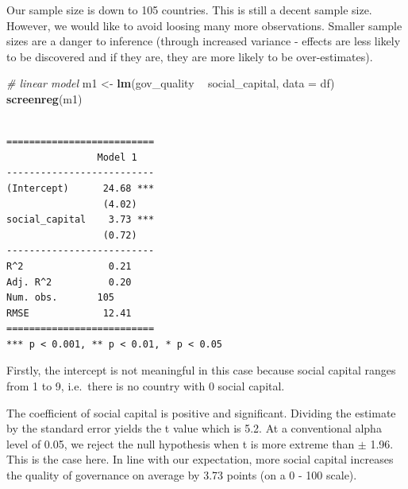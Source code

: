 \documentclass[]{article}
\newenvironment{Shaded}{\begin{snugshade}}{\end{snugshade}}
\newcommand{\KeywordTok}[1]{\textcolor[rgb]{0.13,0.29,0.53}{\textbf{#1}}}
\newcommand{\DataTypeTok}[1]{\textcolor[rgb]{0.13,0.29,0.53}{#1}}
\newcommand{\StringTok}[1]{\textcolor[rgb]{0.31,0.60,0.02}{#1}}
\newcommand{\CommentTok}[1]{\textcolor[rgb]{0.56,0.35,0.01}{\textit{#1}}}
\newcommand{\OperatorTok}[1]{\textcolor[rgb]{0.81,0.36,0.00}{\textbf{#1}}}
\newcommand{\NormalTok}[1]{#1}
\theoremstyle{definition}
\theoremstyle{definition}
\theoremstyle{definition}
\theoremstyle{remark}
\begin{document}
\begin{Shaded}
\end{Shaded}

Our sample size is down to 105 countries. This is still a decent sample
size. However, we would like to avoid loosing many more observations.
Smaller sample sizes are a danger to inference (through increased
variance - effects are less likely to be discovered and if they are,
they are more likely to be over-estimates).

\begin{Shaded}
\begin{Highlighting}[]
\CommentTok{# linear model}
\NormalTok{m1 <-}\StringTok{ }\KeywordTok{lm}\NormalTok{(gov_quality }\OperatorTok{~}\StringTok{ }\NormalTok{social_capital, }\DataTypeTok{data =}\NormalTok{ df)}
\KeywordTok{screenreg}\NormalTok{(m1)}
\end{Highlighting}
\end{Shaded}

\begin{verbatim}

==========================
                Model 1   
--------------------------
(Intercept)      24.68 ***
                 (4.02)   
social_capital    3.73 ***
                 (0.72)   
--------------------------
R^2               0.21    
Adj. R^2          0.20    
Num. obs.       105       
RMSE             12.41    
==========================
*** p < 0.001, ** p < 0.01, * p < 0.05
\end{verbatim}

Firstly, the intercept is not meaningful in this case because social
capital ranges from 1 to 9, i.e.~there is no country with 0 social
capital.

The coefficient of social capital is positive and significant. Dividing
the estimate by the standard error yields the t value which is 5.2. At a
conventional alpha level of 0.05, we reject the null hypothesis when t
is more extreme than \(\pm\) 1.96. This is the case here. In line with
our expectation, more social capital increases the quality of governance
on average by 3.73 points (on a 0 - 100 scale).
\end{document}
